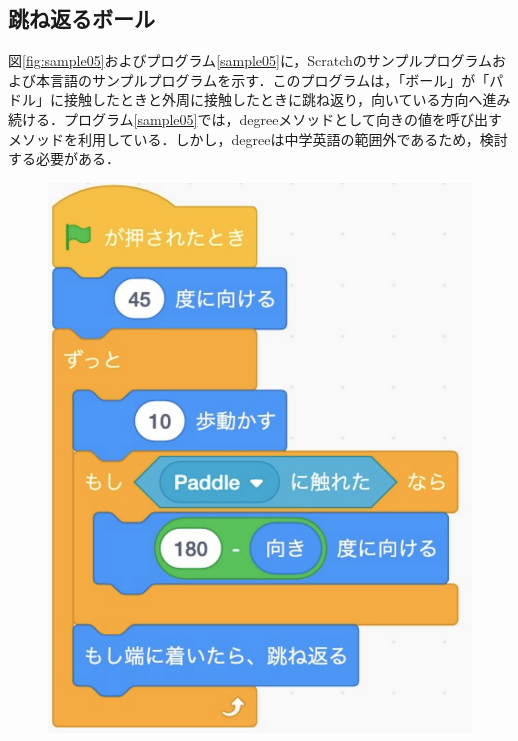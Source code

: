 \documentclass[10pt,a4j]{ltjsarticle}
\begin{document}
\subsection{跳ね返るボール}
図\ref{fig:sample05}およびプログラム\ref{sample05}に，Scratchのサンプルプログラムおよび本言語のサンプルプログラムを示す．このプログラムは，「ボール」が「パドル」に接触したときと外周に接触したときに跳ね返り，向いている方向へ進み続ける．プログラム\ref{sample05}では，degreeメソッドとして向きの値を呼び出すメソッドを利用している．しかし，degreeは中学英語の範囲外であるため，検討する必要がある．

\begin{figure}[H]
  \begin{minipage}[b]{0.5\linewidth}
    \centering
    \includegraphics[keepaspectratio, scale=0.3]{images/sample05-1.pdf}
  \end{minipage}
  \begin{minipage}[b]{0.5\linewidth}
    \centering

\end{minipage}
\end{figure}
\end{document}
